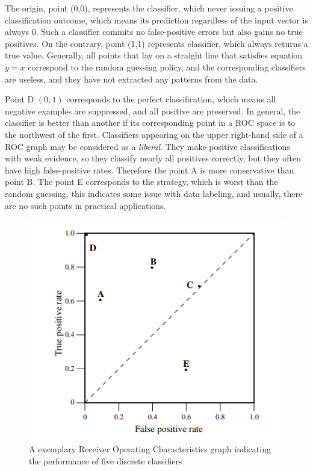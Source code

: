 The origin, point (0,0), represents the classifier, which never issuing a positive classification outcome, which means its prediction regardless of the input vector is always 0. Such a classifier commits no false-positive errors but also gains no true positives. On the contrary, point (1,1) represents classifier, which always returns a true value. Generally, all points that lay on a straight line that satisfies equation $y=x$ correspond to the random guessing policy, and the corresponding classifiers are useless, and they have not extracted any patterns from the data.  

Point D $(0,1)$ corresponds to the perfect classification, which means all negative examples are suppressed, and all positive are preserved. In general, the classifier is better than another if its corresponding point in a ROC space is to the northwest of the first. Classifiers appearing on the upper right-hand side of a ROC graph may be considered as a \textit{liberal}. They make positive classifications with weak evidence, so they classify nearly all positives correctly, but they often have high false-positive rates. Therefore the point A is more conservative than point B. The point E corresponds to the strategy, which is worst than the random guessing, this indicates some issue with data labeling, and usually, there are no such points in practical applications. 

\begin{figure}[!ht]
\centering
\includegraphics[scale=0.7]{figures/ExampleROC.PNG}
\caption{A exemplary Receiver Operating Characteristics graph indicating the performance of five discrete classifiers
\label{fig:ROC_eg}}
\end{figure}

